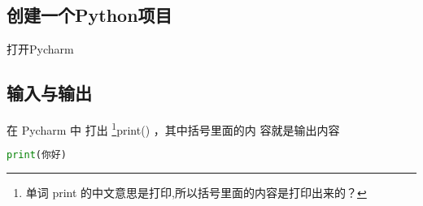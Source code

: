 
\subsection{创建一个Python项目}

打开Pycharm

\subsection{输入与输出}

在 Pycharm 中 打出 \footnote{单词 print 的中文意思是打印,所以括号里面的内容是打印出来的？}print() ，其中括号里面的内
容就是输出内容 

\begin{lstlisting}[language=python]
print(你好)
\end{lstlisting}
